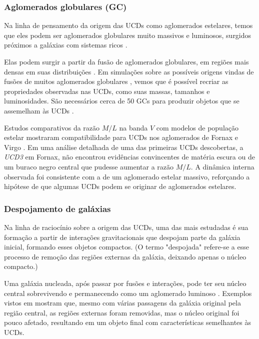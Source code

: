 \subsubsection{Aglomerados globulares (GC)}\label{subsubsec:}
Na linha de pensamento da origem das UCDs como aglomerados estelares, temos que eles podem ser aglomerados globulares muito massivos e luminosos, surgidos próximos a galáxias com sistemas ricos \citep{Mieske_2002}.

Elas podem surgir a partir da fusão de aglomerados globulares, em regiões mais densas em suas distribuições \citep{Fellhauer_2002}. Em simulações sobre as possíveis origens vindas de fusões de muitos aglomerados globulares \citep{Goerdt_2008}, vemos que é possível recriar as propriedades observadas nas UCDs, como suas massas, tamanhos e luminosidades. São necessários cerca de 50 GCs para produzir objetos que se assemelham às UCDs \citep{Goerdt_2008}.

Estudos comparativos da razão $M/L$ na banda $V$ com modelos de população estelar mostraram compatibilidade para UCDs nos aglomerados de Fornax \citep{Hilker_2006} e Virgo \citep{Evstigneeva_2007}. Em uma análise detalhada de uma das primeiras UCDs descobertas, a \textit{UCD3} em Fornax, \cite{Frank_2011} não encontrou evidências convincentes de matéria escura ou de um buraco negro central que pudesse aumentar a razão $M/L$. A dinâmica interna observada foi consistente com a de um aglomerado estelar massivo, reforçando a hipótese de que algumas UCDs podem se originar de aglomerados estelares.

\subsubsection{Despojamento de galáxias}\label{subsubsec:Galaxy stripping}

Na linha de raciocínio sobre a origem das UCDs, uma das mais estudadas é sua formação a partir de interações gravitacionais que despojam parte da galáxia inicial, formando esses objetos compactos. (O termo "despojada" refere-se a esse processo de remoção das regiões externas da galáxia, deixando apenas o núcleo compacto.)

Uma galáxia nucleada, após passar por fusões e interações, pode ter seu núcleo central sobrevivendo e permanecendo como um aglomerado luminoso \citep{Bassino_1994}. Exemplos vistos em \cite{Bekki_2001} mostram que, mesmo com várias passagens da galáxia original pela região central, as regiões externas foram removidas, mas o núcleo original foi pouco afetado, resultando em um objeto final com características semelhantes às UCDs.

